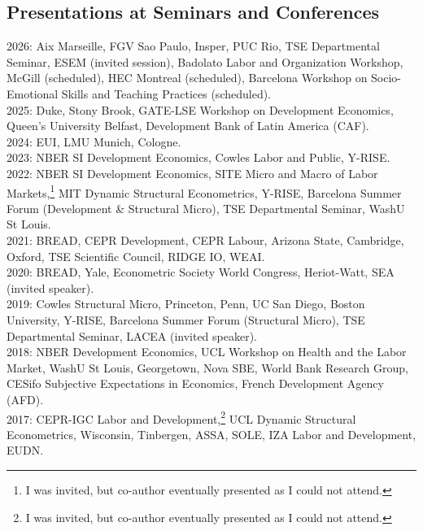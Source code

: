 \documentclass[12pt,english]{article}
\begin{document}
\subsection*{Presentations at Seminars and Conferences}
2026: Aix Marseille, FGV Sao Paulo, Insper, PUC Rio, TSE Departmental Seminar, ESEM (invited session), Badolato Labor and Organization Workshop, McGill (scheduled), HEC Montreal (scheduled), Barcelona Workshop on Socio-Emotional Skills and Teaching Practices (scheduled).\vspace{0.2cm} \\
2025: Duke, Stony Brook, GATE-LSE Workshop on Development Economics, Queen's University Belfast, Development Bank of Latin America (CAF).\vspace{0.2cm} \\
2024: EUI, LMU Munich, Cologne. \vspace{0.2cm} \\
2023: NBER SI Development Economics, Cowles Labor and Public, Y-RISE.\vspace{0.2cm} \\
2022: NBER SI Development Economics, SITE Micro and Macro of Labor Markets,\footnote{I was invited, but co-author eventually presented as I could not attend.} MIT Dynamic Structural Econometrics, Y-RISE, Barcelona Summer Forum (Development \& Structural Micro), TSE Departmental Seminar, WashU St Louis.\vspace{0.2cm} \\
2021: BREAD, CEPR Development, CEPR Labour, Arizona State, Cambridge, Oxford, TSE Scientific Council, RIDGE IO, WEAI.\vspace{0.2cm} \\
2020: BREAD, Yale, Econometric Society World Congress, Heriot-Watt, SEA (invited speaker). \vspace{0.2cm} \\
2019:  Cowles Structural Micro, Princeton, Penn, UC San Diego, Boston University, Y-RISE, Barcelona Summer Forum (Structural Micro), TSE Departmental Seminar, LACEA (invited speaker).\vspace{0.2cm} \\
2018: NBER Development Economics, UCL Workshop on Health and the Labor Market, WashU St Louis, Georgetown, Nova SBE, World Bank Research Group, CESifo Subjective Expectations in Economics, French Development Agency (AFD).\vspace{0.2cm} \\
2017: CEPR-IGC Labor and Development,\footnote{I was invited, but co-author eventually presented as I could not attend.} UCL Dynamic Structural Econometrics, Wisconsin, Tinbergen, ASSA, SOLE, IZA Labor and Development, EUDN.\vspace{0.2cm} \\
\end{document}
